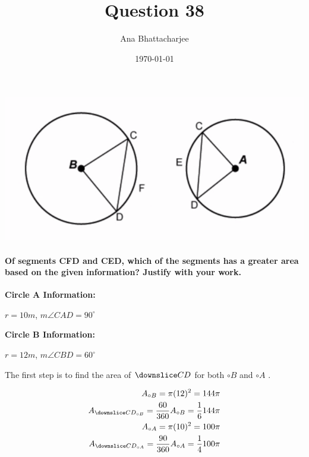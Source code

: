 \documentclass{article}
\begin{document}
\title{Question 38}
\author{Ana Bhattacharjee}
\date{\today}
\maketitle{}


\includegraphics[width=0.9\columnwidth]{q38.png}
\paragraph{Of segments CFD and CED, which of the segments has a greater area based on the given information? Justify with your work.}
\par

\textbf{Circle A Information: }
\par
$ r = 10 m $, $ m\angle{CAD} = 90^\circ$
\par
\textbf{Circle B Information: }
\par
$ r = 12 m $, $ m\angle{CBD} = 60^\circ$

The first step is to find the area of $ \downslice CD $ for both $ \circ B $ and $ \circ A $ .

\begin{align}
  A_{\circ B} = \pi (12)^2 = 144 \pi \\
  A_{\downslice CD_{\circ B}} = \frac{60}{360} A_{\circ B} = \frac{1}{6} 144 \pi \\
  A_{\circ A} = \pi (10)^2 = 100 \pi \\
  A_{\downslice CD_{\circ A}} = \frac{90}{360} A_{\circ A} = \frac{1}{4} 100 \pi
\end{align}

\par
\end{document}
